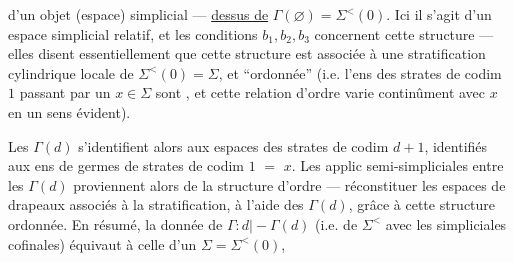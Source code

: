 d'un objet (espace) simplicial --- \uline{dessus de}
$\Gamma(\varnothing)=\Sigma^{<}(0)$. Ici il s'agit d'un espace
simplicial relatif, et les conditions $b_1,b_2,b_3$
concernent cette structure --- elles disent
essentiellement que cette structure est associée
à une stratification cylindrique locale de
$\Sigma^{<}(0)=\Sigma$, et ``ordonnée'' (i.e. l'ens des
strates de codim $1$ passant par un $x\in\Sigma$ sont
 , et cette relation d'ordre varie
continûment avec $x$ en un sens évident).

Les  $\Gamma(d)$ s'identifient alors
aux  espaces des  strates de codim
$d+1$,   identifiés  aux ens de germes de strates
de codim $1$   $=$ $x$. Les applic
semi-simpliciales entre les $\Gamma(d)$ proviennent
alors de la structure d'ordre --- 
 réconstituer les espaces de drapeaux
associés à la stratification, à l'aide des
 $\Gamma(d)$, grâce à cette structure ordonnée.
En résumé, la donnée de $\Gamma:d\mathrel{\mid\! -\!}\Gamma(d)$
 (i.e. de $\Sigma^{<}$ avec les   simpliciales
cofinales) équivaut à celle d'un $\Sigma=\Sigma^{<}(0)$,

